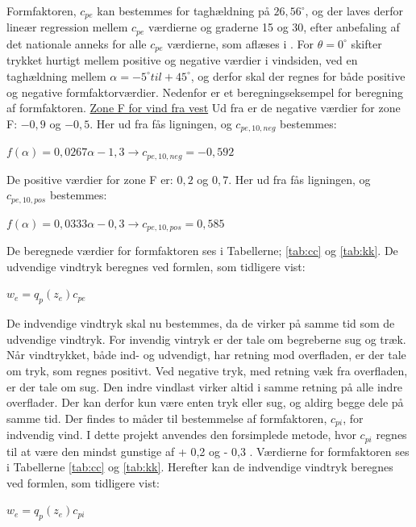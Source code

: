 Formfaktoren, $c_{pe}$ kan bestemmes for taghældning på $26,\!56^{\circ}$, og der laves derfor lineær regression mellem $c_{pe}$ værdierne og graderne 15 og 30, efter anbefaling af det nationale anneks for alle $c_{pe}$ værdierne, som aflæses i \citep[ tabel 7.4a kapitel 7.2.5]{EU91}. For $\theta = 0^{\circ}$ skifter trykket hurtigt mellem positive og negative værdier i vindsiden, ved en taghældning mellem $\alpha = -5^{\circ} til + 45^{\circ}$, og derfor skal der regnes for både positive og negative formfaktorværdier. 
\newline \indent{     }  Nedenfor er et beregningseksempel for beregning af formfaktoren.
\newline
\newline
\underline{Zone F for vind fra vest}
\newline
Ud fra \citep[ tabel 7.4a kapitel 7.2.5]{EU91} er de negative værdier for zone F: $-0,\!9$ og $-0,\!5$. Her ud fra fås ligningen, og $c_{pe,10,neg}$ bestemmes:
\begin{center}
	$f(\alpha)=0,\!0267\alpha - 1,\!3 \to c_{pe,10,neg}=-0,\!592$
\end{center}
De positive værdier for zone F er: $0,\!2$ og $0,\!7$. Her ud fra fås ligningen, og $c_{pe,10,pos}$ bestemmes:
\begin{center}
	$f(\alpha)=0,\!0333\alpha - 0,\!3 \to c_{pe,10,pos}=0,\!585$
\end{center}

De beregnede værdier for formfaktoren ses i Tabellerne; \ref{tab:cc} og \ref{tab:kk}. 
\newline
\newline
De udvendige vindtryk beregnes ved formlen, som tidligere vist:
\begin{center} 
	$w_e=q_p(z_e)c_{pe}$
\end{center}

De indvendige vindtryk skal nu bestemmes, da de virker på samme tid som de udvendige vindtryk. For invendig vintryk er der tale om begreberne sug og træk.
\newline \indent{     }  Når vindtrykket, både ind- og udvendigt, har retning mod overfladen, er der tale om tryk, som regnes positivt. Ved negative tryk, med retning væk fra overfladen, er der tale om sug.
\newline
\newline
Den indre vindlast virker altid i samme retning på alle indre overflader. Der kan derfor kun være enten tryk eller sug, og aldirg begge dele på samme tid.
\newline
\newline
Der findes to måder til bestemmelse af formfaktoren, $c_{pi}$, for indvendig vind. I dette projekt anvendes den forsimplede metode, hvor $c_{pi}$ regnes til at være den mindst gunstige af + 0,2 og - 0,3 \citep[Kapitel 7]{EU91}. Værdierne for formfaktoren ses i Tabellerne \ref{tab:cc} og \ref{tab:kk}.
\newline
\newline
Herefter kan de indvendige vindtryk beregnes ved formlen, som tidligere vist:
\begin{center} 
	$w_e=q_p(z_e)c_{pi}$
\end{center}

